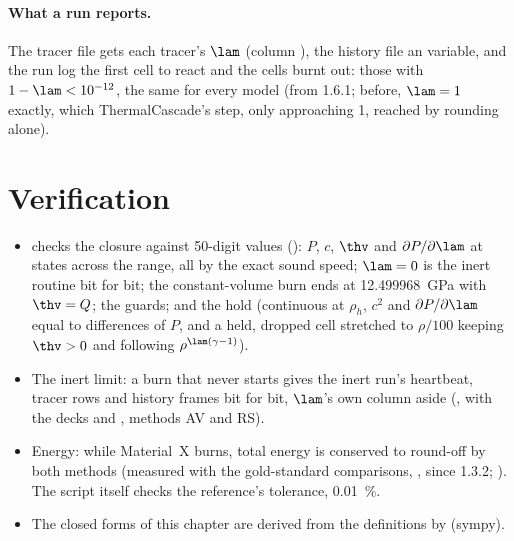 \paragraph{What a run reports.} The tracer file gets each tracer's $\lam$
(column ), the history file an  variable, and the run log
the first cell to react and the cells burnt out: those with $1 - \lam <
10^{-12}$, the same for every model (from 1.6.1; before, $\lam = 1$ exactly,
which ThermalCascade's step, only approaching 1, reached by rounding alone).

\section{Verification}
\label{sec:burning-cell-verification}

\begin{itemize}
\item {} checks the closure against 50-digit values
  (): $P$, $c$, $\thv$ and $\partial
  P/\partial\lam$ at states across the range, all by the exact sound speed;
  $\lam = 0$ is the inert routine bit for bit; the constant-volume burn ends
  at 12.499968~GPa with $\thv = Q$; the guards; and the hold (continuous at
  $\rho_h$, $c^2$ and $\partial P/\partial\lam$ equal to differences of $P$,
  and a held, dropped cell stretched to $\rho/100$ keeping $\thv > 0$ and
  following $\rho^{\lam(\gamma-1)}$).
\item The inert limit: a burn that never starts gives the inert run's
  heartbeat, tracer rows and history frames bit for bit, $\lam$'s own column
  aside (, with the decks
   and , methods AV and RS).
\item Energy: while Material~X burns, total energy is conserved to
  round-off by both methods (measured with the gold-standard comparisons,
  , since 1.3.2;
  ). The script itself checks the
  reference's tolerance, 0.01~\%.
\item The closed forms of this chapter are derived from the definitions by
   (sympy).
\end{itemize}

